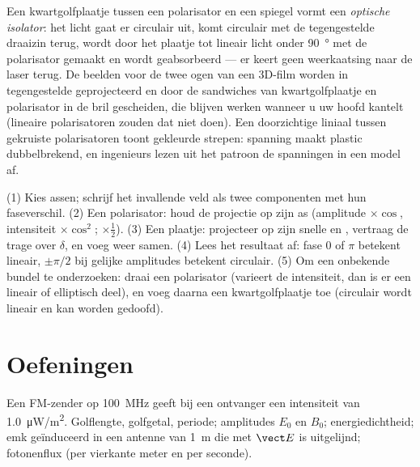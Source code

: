 \begin{example}\label{ex:b2:plane-waves-polarization:plateuses}
Een kwartgolfplaatje tussen een polarisator en een spiegel vormt een
\emph{optische isolator}: het licht gaat er circulair uit, komt circulair
met de tegengestelde draaizin terug, wordt door het plaatje tot lineair
licht onder \qty{90}{\degree} met de polarisator gemaakt en wordt
geabsorbeerd --- er keert geen weerkaatsing naar de laser terug. De beelden
voor de twee ogen van een 3D-film worden in tegengestelde  geprojecteerd en door de sandwiches van kwartgolfplaatje en
polarisator in de bril gescheiden, die blijven werken wanneer u uw hoofd
kantelt (lineaire polarisatoren zouden dat niet doen). Een doorzichtige
liniaal tussen gekruiste polarisatoren toont gekleurde strepen: spanning
maakt plastic dubbelbrekend, en ingenieurs lezen uit het patroon de
spanningen in een model af.
\end{example}

\begin{method}\label{met:b2:plane-waves-polarization:method}
(1) Kies assen; schrijf het invallende veld als twee componenten met hun
faseverschil. (2) Een polarisator: houd de projectie op zijn as (amplitude
$\times\cos$, intensiteit $\times\cos^2$; 
$\times\tfrac12$). (3) Een plaatje: projecteer op zijn snelle en ,
vertraag de trage over $\delta$, en voeg weer samen. (4) Lees het resultaat
af: fase $0$ of $\pi$ betekent lineair, $\pm\pi/2$ bij gelijke amplitudes
betekent circulair. (5) Om een onbekende bundel te onderzoeken: draai een
polarisator (varieert de intensiteit, dan is er een lineair of elliptisch
deel), en voeg daarna een kwartgolfplaatje toe (circulair wordt lineair en
kan worden gedoofd).
\end{method}

\section{Oefeningen}

\begin{exercise}[$\star$]\label{exo:b2:plane-waves-polarization:1}
Een FM-zender op \qty{100}{MHz} geeft bij een ontvanger een intensiteit van
\qty{1.0}{\micro W/m^2}. Golflengte, golfgetal, periode; amplitudes $E_0$ en
$B_0$; energiedichtheid; emk geïnduceerd in een antenne van \qty{1}{m} die
met $\vect E$ is uitgelijnd; fotonenflux (per vierkante meter en per
seconde).
\end{exercise}

